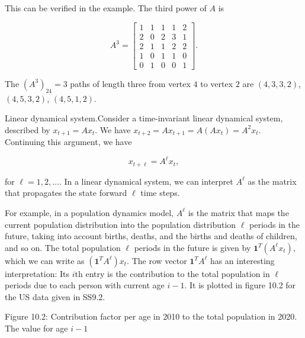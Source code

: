 This can be verified in the example. The third power of \(A\) is

\[A^{3}=\left[\begin{array}{cccccc}1&1&1&1&2\\ 2&0&2&3&1\\ 2&1&1&2&2\\ 1&0&1&1&0\\ 0&1&0&0&1\end{array}\right].\]

The \((A^{3})_{24}=3\) paths of length three from vertex \(4\) to vertex \(2\) are \((4,3,3,2)\), \((4,5,3,2)\), \((4,5,1,2)\).

Linear dynamical system.Consider a time-invariant linear dynamical system, described by \(x_{t+1}=Ax_{t}\). We have \(x_{t+2}=Ax_{t+1}=A(Ax_{t})=A^{2}x_{t}\). Continuing this argument, we have

\[x_{t+\ell}=A^{\ell}x_{t},\]

for \(\ell=1,2,\ldots\). In a linear dynamical system, we can interpret \(A^{\ell}\) as the matrix that propagates the state forward \(\ell\) time steps.

For example, in a population dynamics model, \(A^{\ell}\) is the matrix that maps the current population distribution into the population distribution \(\ell\) periods in the future, taking into account births, deaths, and the births and deaths of children, and so on. The total population \(\ell\) periods in the future is given by \(\mathbf{1}^{T}(A^{\ell}x_{t})\), which we can write as \((\mathbf{1}^{T}A^{\ell})x_{t}\). The row vector \(\mathbf{1}^{T}A^{\ell}\) has an interesting interpretation: Its \(i\)th entry is the contribution to the total population in \(\ell\) periods due to each person with current age \(i-1\). It is plotted in figure 10.2 for the US data given in SS9.2.

Figure 10.2: Contribution factor per age in 2010 to the total population in 2020. The value for age \(i-1\)

